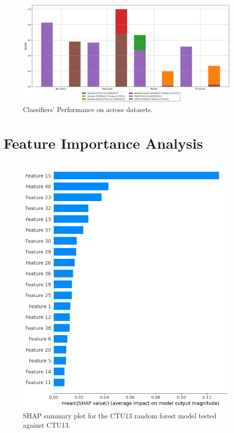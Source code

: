 \begin{figure}[H]
    \centering
    \includegraphics[width=1\textwidth]{img/Classifier_Performance _Across_Datasets.png}
    \caption{Classifiers' Performance on across datasets.}\label{fig:classifier_performance_across_dataset}
\end{figure}

\section{Feature Importance Analysis}

\begin{figure}[H]
    \centering
    \includegraphics[width=1\textwidth]{img/SHAP_RFCTU13_CTU13.png}
    \caption{SHAP summary plot for the CTU13 random forest model tested against CTU13.}\label{fig:shap_rfc_ctu13_ctu13}
\end{figure}

